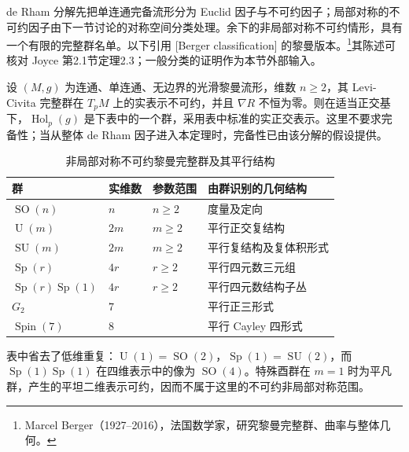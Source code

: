 de Rham 分解先把单连通完备流形分为 Euclid 因子与不可约因子；局部对称的不可约因子由下一节讨论的对称空间分类处理。余下的非局部对称不可约情形，具有一个有限的完整群名单。以下引用 [Berger classification] 的黎曼版本。\footnote{Marcel Berger（1927--2016），法国数学家，研究黎曼完整群、曲率与整体几何。}其陈述可核对 Joyce 第2.1节定理2.3\cite[第2.1节，定理2.3，第111--112页]{Joyce2006ExceptionalHolonomy}；一般分类的证明作为本节外部输入。

\begin{theorem}[Berger 分类]\label{g3:thm:berger-classification}
	设 \((M,g)\) 为连通、单连通、无边界的光滑黎曼流形，维数 \(n\ge2\)，其 Levi-Civita 完整群在 \(T_pM\) 上的实表示不可约，并且 \(\nabla R\) 不恒为零。则在适当正交基下，\(\operatorname{Hol}_p(g)\) 是下表中的一个群，采用表中标准的实正交表示。这里不要求完备性；当从整体 de Rham 因子进入本定理时，完备性已由该分解的假设提供。
\end{theorem}

\begin{table}[htbp]
	\centering
	\caption{非局部对称不可约黎曼完整群及其平行结构}
	\label{g3:tab:berger-holonomy}
	\begin{tabularx}{\textwidth}{@{}lllX@{}}
		\toprule
		群 & 实维数 & 参数范围 & 由群识别的几何结构 \\
		\midrule
		\(\operatorname{SO}(n)\) & \(n\) & \(n\ge2\) & 度量及定向 \\
		\(\operatorname U(m)\) & \(2m\) & \(m\ge2\) & 平行正交复结构 \\
		\(\operatorname{SU}(m)\) & \(2m\) & \(m\ge2\) & 平行复结构及复体积形式 \\
		\(\operatorname{Sp}(r)\) & \(4r\) & \(r\ge2\) & 平行四元数三元组 \\
		\(\operatorname{Sp}(r)\operatorname{Sp}(1)\) & \(4r\) & \(r\ge2\) & 平行四元数结构子丛 \\
		\(G_2\) & \(7\) & & 平行正三形式 \\
		\(\operatorname{Spin}(7)\) & \(8\) & & 平行 Cayley 四形式 \\
		\bottomrule
	\end{tabularx}
\end{table}

表中省去了低维重复：\(\operatorname U(1)=\operatorname{SO}(2)\)，\(\operatorname{Sp}(1)=\operatorname{SU}(2)\)，而 \(\operatorname{Sp}(1)\operatorname{Sp}(1)\) 在四维表示中的像为 \(\operatorname{SO}(4)\)。特殊酉群在 \(m=1\) 时为平凡群，产生的平坦二维表示可约，因而不属于这里的不可约非局部对称范围。

